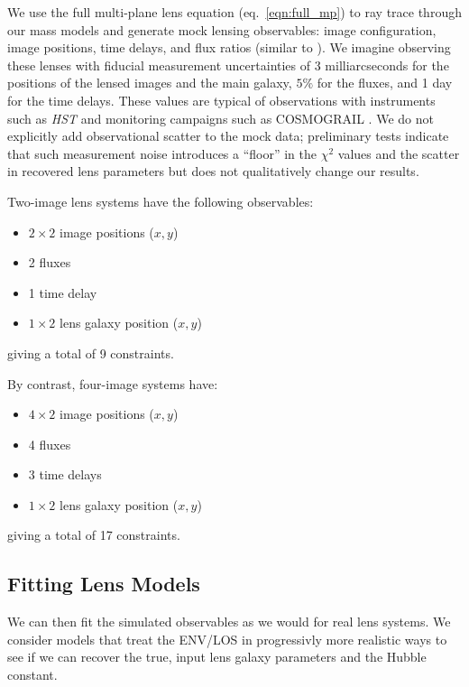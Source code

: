 \documentclass{emulateapj}
\begin{document}
We use the full multi-plane lens equation (eq.\ \ref{eqn:full_mp}) to ray trace through our mass models and generate mock lensing observables: image configuration, image positions, time delays, and flux ratios (similar to \citealt{Petkova14}). We imagine observing these lenses with fiducial measurement uncertainties of 3 milliarcseconds for the positions of the lensed images and the main galaxy, $5\%$ for the fluxes, and 1 day for the time delays. These values are typical of observations with instruments such as \emph{HST} and monitoring campaigns such as COSMOGRAIL \citep{Eigenbrod05}. We do not explicitly add observational scatter to the mock data; preliminary tests indicate that such measurement noise introduces a ``floor'' in the $\chi^2$ values and the scatter in recovered lens parameters but does not qualitatively change our results.

Two-image lens systems have the following observables:
\begin{itemize}
\item $2\times 2$ image  positions ($x,y$)
\item 2 fluxes
\item 1 time delay 
\item $1\times 2$ lens galaxy position ($x,y$)
\end{itemize}
giving a total of 9 constraints.

By contrast, four-image systems have:
\begin{itemize}
\item $4\times 2$ image positions ($x,y$)
\item 4 fluxes
\item 3 time delays
\item $1\times 2$ lens galaxy position ($x,y$) 
\end{itemize}
giving a total of 17 constraints.


\subsection{Fitting Lens Models \label{sec:lensmodels}}

We can then fit the simulated observables as we would for real lens systems. We consider models that treat the ENV/LOS in progressivly more realistic ways to see if we can recover the true, input lens galaxy parameters and the Hubble constant. 
\end{document}
